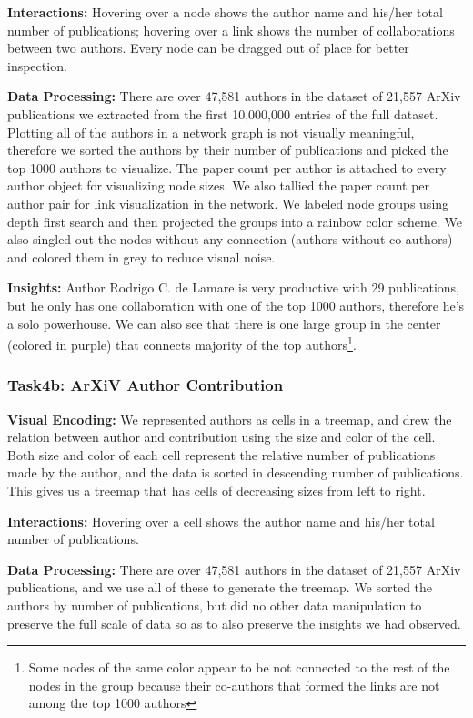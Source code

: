\documentclass{article}
\begin{document}
\textbf{Interactions:} Hovering over a node shows the author name and his/her total number of publications; hovering over a link shows the number of collaborations between two authors. Every node can be dragged out of place for better inspection. 

\textbf{Data Processing:} There are over 47,581 authors in the dataset of 21,557 ArXiv publications we extracted from the first 10,000,000 entries of the full dataset. Plotting all of the authors in a network graph is not visually meaningful, therefore we sorted the authors by their number of publications and picked the top 1000 authors to visualize. The paper count per author is attached to every author object for visualizing node sizes. We also tallied the paper count per author pair for link visualization in the network. We labeled node groups using depth first search and then projected the groups into a rainbow color scheme. We also singled out the nodes without any connection (authors without co-authors) and colored them in grey to reduce visual noise.

\textbf{Insights:} Author Rodrigo C. de Lamare is very productive with 29 publications, but he only has one collaboration with one of the top 1000 authors, therefore he's a solo powerhouse. We can also see that there is one large group in the center (colored in purple) that connects majority of the top authors\footnote{Some nodes of the same color appear to be not connected to the rest of the nodes in the group because their co-authors that formed the links are not among the top 1000 authors}.

\subsubsection*{Task4b: ArXiV Author Contribution}
\textbf{Visual Encoding:} We represented authors as cells in a treemap, and drew the relation between author and contribution using the size and color of the cell. Both size and color of each cell represent the relative number of publications made by the author, and the data is sorted in descending number of publications. This gives us a treemap that has cells of decreasing sizes from left to right. 

\textbf{Interactions:} Hovering over a cell shows the author name and his/her total number of publications. 

\textbf{Data Processing:} There are over 47,581 authors in the dataset of 21,557 ArXiv publications, and we use all of these to generate the treemap. We sorted the authors by number of publications, but did no other data manipulation to preserve the full scale of data so as to also preserve the insights we had observed. 
\end{document}
